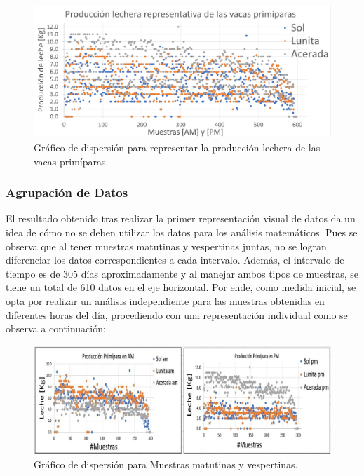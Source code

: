 \begin{figure}[H]
	 \begin{center}
	 \includegraphics[scale=0.452]{img/scatterparto1.jpg}
	 \end{center}
	 \caption{Gráfico de dispersión para representar la producción lechera de las vacas primíparas. \label{scatterparto1png}}
\end{figure}

\subsubsection{Agrupación de Datos}

El resultado obtenido tras realizar la primer representación visual de datos da un idea de cómo no se deben utilizar los datos para los análisis matemáticos. Pues se observa que al tener muestras matutinas y vespertinas juntas, no se logran diferenciar los datos correspondientes a cada intervalo. Además, el intervalo de tiempo es de 305 días aproximadamente y al manejar ambos tipos de muestras, se tiene un total de 610 datos en el eje horizontal. Por ende, como medida inicial, se opta por realizar un análisis independiente para las muestras obtenidas en diferentes horas del día, procediendo con una representación individual como se observa a continuación:

\begin{figure}[H]
	 \begin{center}
	 \includegraphics[scale=0.575]{img/desfaseAMPM.jpg}
	 \end{center}
	 \caption{Gráfico de dispersión para Muestras matutinas y vespertinas. \label{desfaseAMPMpng}}
\end{figure}

